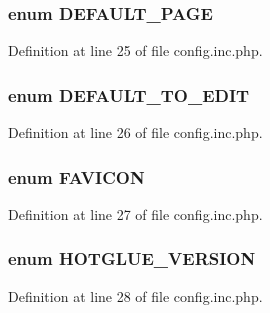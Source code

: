 \hypertarget{config_8inc_8php_a4208e17d37801abf0982b2d1e625a8f2}{
\subsubsection[{DEFAULT\_\-PAGE}]{\setlength{\rightskip}{0pt plus 5cm}enum {\bf DEFAULT\_\-PAGE}}}
\label{config_8inc_8php_a4208e17d37801abf0982b2d1e625a8f2}


Definition at line 25 of file config.inc.php.

\hypertarget{config_8inc_8php_a3b22c0132666a0112334ed38a21de8ce}{
\subsubsection[{DEFAULT\_\-TO\_\-EDIT}]{\setlength{\rightskip}{0pt plus 5cm}enum {\bf DEFAULT\_\-TO\_\-EDIT}}}
\label{config_8inc_8php_a3b22c0132666a0112334ed38a21de8ce}


Definition at line 26 of file config.inc.php.

\hypertarget{config_8inc_8php_afd55d95ee6651060397404533516882a}{
\subsubsection[{FAVICON}]{\setlength{\rightskip}{0pt plus 5cm}enum {\bf FAVICON}}}
\label{config_8inc_8php_afd55d95ee6651060397404533516882a}


Definition at line 27 of file config.inc.php.

\hypertarget{config_8inc_8php_a7c35565a4692ae46fd1c04340f4f1ca9}{
\subsubsection[{HOTGLUE\_\-VERSION}]{\setlength{\rightskip}{0pt plus 5cm}enum {\bf HOTGLUE\_\-VERSION}}}
\label{config_8inc_8php_a7c35565a4692ae46fd1c04340f4f1ca9}


Definition at line 28 of file config.inc.php.

